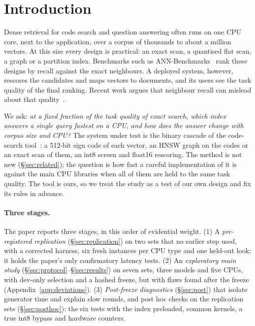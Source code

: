 \section{Introduction}\label{sec:intro}

Dense retrieval for code search and question answering often runs on one CPU core, next to the application, over a
corpus of thousands to about a million vectors. At this size every design is practical: an exact scan, a quantised
flat scan, a graph or a partition index. Benchmarks such as ANN-Benchmarks~\cite{aumuller2020annbenchmarks} rank these
designs by recall against the exact neighbours. A deployed system, however, rescores the candidates and maps vectors to
documents, and its users see the task quality of the final ranking. Recent work argues that neighbour recall can
mislead about that quality~\cite{chen2026iceberg,dimitropoulos2026recall}.

We ask: \emph{at a fixed fraction of the task quality of exact search, which index answers a single query fastest on a
CPU, and how does the answer change with corpus size and CPU?} The system under test is the binary cascade of the \sweet
code-search tool~\cite{sweetsearch_repo}: a 512-bit sign code of each vector, an HNSW graph on the codes or an exact scan
of them, an int8 screen and float16 rescoring. The method is not new (\S\ref{sec:related}); the question is how fast a
careful implementation of it is against the main CPU libraries when all of them are held to the same task quality. The
tool is ours, so we treat the study as a test of our own design and fix its rules in advance.

\paragraph{Three stages.} The paper reports three stages, in this order of evidential weight. (1) A
\emph{pre-registered replication} (\S\ref{sec:replication}) on two sets that no earlier step used, with a corrected
harness, six fresh instances per CPU type and one held-out look; it holds the paper's only confirmatory latency tests.
(2) An \emph{exploratory main study} (\S\ref{sec:protocol}--\S\ref{sec:results}) on seven sets, three models and five
CPUs, with dev-only selection and a hashed freeze, but with flaws found after the freeze (Appendix~\ref{app:deviations}).
(3) \emph{Post-freeze diagnostics} (\S\ref{sec:post}) that isolate generator time and explain slow rounds, and post hoc
checks on the replication sets (\S\ref{sec:posthoc}): the six tests with the index preloaded, common kernels, a true int8
bypass and hardware counters.

